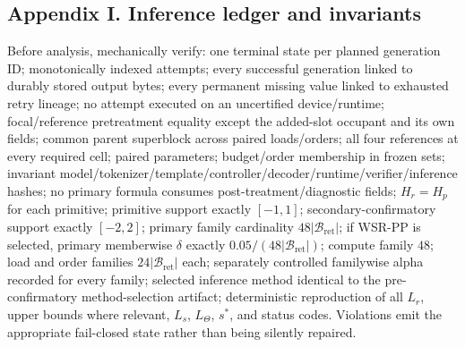 \documentclass[11pt,a4paper]{article}
\newcommand{\Bret}{\mathcal B_{\mathrm{ret}}}
\begin{document}
\subsection*{Appendix I. Inference ledger and invariants}
Before analysis, mechanically verify: one terminal state per planned generation ID; monotonically indexed attempts; every successful generation linked to durably stored output bytes; every permanent missing value linked to exhausted retry lineage; no attempt executed on an uncertified device/runtime; focal/reference pretreatment equality except the added-slot occupant and its own fields; common parent superblock across paired loads/orders; all four references at every required cell; paired parameters; budget/order membership in frozen sets; invariant model/tokenizer/template/controller/decoder/runtime/verifier/inference hashes; no primary formula consumes post-treatment/diagnostic fields; $H_r=H_p$ for each primitive; primitive support exactly $[-1,1]$; secondary-confirmatory support exactly $[-2,2]$; primary family cardinality $48|\Bret|$; if WSR-PP is selected, primary memberwise $\delta$ exactly $0.05/(48|\Bret|)$; compute family $48$; load and order families $24|\Bret|$ each; separately controlled familywise alpha recorded for every family; selected inference method identical to the pre-confirmatory method-selection artifact; deterministic reproduction of all $L_r$, upper bounds where relevant, $L_s$, $L_\Theta$, $s^\ast$, and status codes. Violations emit the appropriate fail-closed state rather than being silently repaired.
\end{document}
